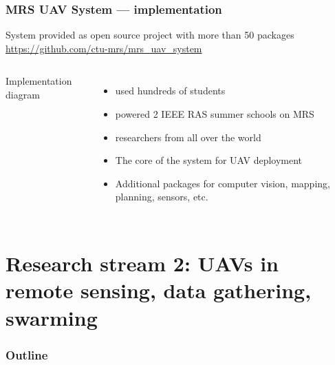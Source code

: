 \documentclass[aspectratio=169]{beamer}
\begin{document}
\begin{frame}
\frametitle{MRS UAV System --- implementation}

\begin{block}{System provided as open source project with more than 50 packages}
  \centering
  \url{https://github.com/ctu-mrs/mrs_uav_system}
\end{block}

\begin{columns}[c]


\begin{block}{Implementation diagram}
  \begin{adjustbox}{max totalsize={1.0\textwidth}{.65\textheight}, center}
    
  \end{adjustbox}
\end{block}


\begin{itemize}
  \item used hundreds of students
  \item powered 2 IEEE RAS summer schools on MRS
  \item researchers from all over the world
  \item The core of the system for UAV deployment
  \item Additional packages for computer vision, mapping, planning, sensors, etc.
\end{itemize}

\end{columns}

\end{frame}



\section{Research stream 2: UAVs in remote sensing, data gathering, swarming}

\begin{frame}
  \frametitle{Outline}
  \tableofcontents[currentsection]
\end{frame}


\end{document}
